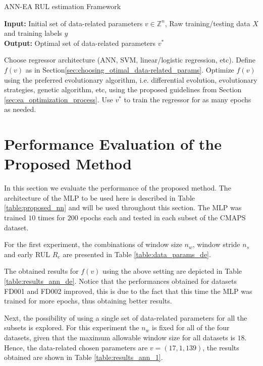 \documentclass[12pt]{IEEEtran}%
\begin{document}
\setcounter{algorithm}{0} \begin{algorithm}[H]
\caption{ANN-EA RUL estimation Framework}\label{alg:rul_framework}
\textbf{Input:} Initial set of data-related parameters $v \in \mathbb{Z}^n$, Raw training/testing data $X$ and training labels $y$\\
\textbf{Output:} Optimal set of data-related parameters $v^*$
	\begin{algorithmic}[1]
		\State Choose regressor architecture (ANN, SVM, linear/logistic regression, etc).
		\State Define $f(v)$ as in Section\ref{sec:choosing_otimal_data-related_params}.
		\State Optimize $f(v)$ using the preferred evolutionary algorithm, i.e. differential evolution, evolutionary strategies, genetic algorithm, etc, using the proposed guidelines from Section \ref{sec:ea_optimization_process}.
		\State Use $v^*$ to train the regressor for as many epochs as needed.
	\end{algorithmic}
\end{algorithm}

\section{Performance Evaluation of the Proposed Method}
\label{sec:rul_eval}

In this section we evaluate the performance of the proposed method. The
architecture of the MLP to be used here is described in Table
\ref{table:proposed_nn} and will be used throughout this section. The MLP was
trained $10$ times for $200$ epochs each and tested in each subset of the
CMAPS dataset.

For the first experiment, the combinations of window size $n_{w}$, window
stride $n_{s}$ and early RUL $R_{e}$ are presented in Table
\ref{table:data_params_de}.

The obtained results for $f(v)$ using the above setting are depicted in Table
\ref{table:results_ann_de}. Notice that the performances obtained for datasets
FD001 and FD002 improved, this is due to the fact that this time the MLP was
trained for more epochs, thus obtaining better results.

Next, the possibility of using a single set of data-related parameters for all
the subsets is explored. For this experiment the $n_{w}$ is fixed for all of
the four datasets, given that the maximum allowable window size for all
datasets is $18$. Hence, the data-related chosen parameters are $v=(17, 1,
139)$, the results obtained are shown in Table \ref{table:results_ann_1}.
\end{document}
